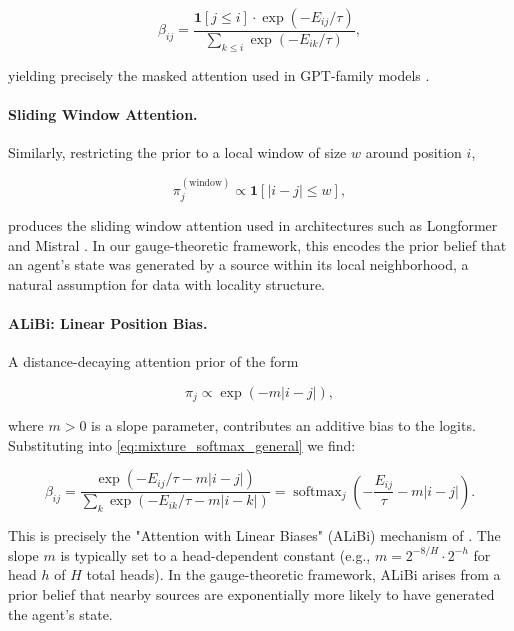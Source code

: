 \documentclass[twoside,11pt]{article}
\begin{document}
\begin{equation}
\beta_{ij} = \frac{\mathbf{1}[j \leq i] \cdot \exp(-E_{ij}/\tau)}{\sum_{k \leq i} \exp(-E_{ik}/\tau)},
\label{eq:causal_attention}
\end{equation}

yielding precisely the masked attention used in GPT-family models \citep{radford2019language}. 

\paragraph{Sliding Window Attention.}
Similarly, restricting the prior to a local window of size $w$ around position $i$,

\begin{equation}
\pi_j^{(\text{window})} \propto \mathbf{1}[|i - j| \leq w],
\label{eq:window_prior}
\end{equation}

produces the sliding window attention used in architectures such as Longformer \citep{beltagy2020longformer} and Mistral \citep{jiang2023mistral}. In our gauge-theoretic framework, this encodes the prior belief that an agent's state was generated by a source within its local neighborhood, a natural assumption for data with locality structure.

\paragraph{ALiBi: Linear Position Bias.}
A distance-decaying attention prior of the form

\begin{equation}
\pi_j \propto \exp(-m|i - j|),
\label{eq:alibi_prior}
\end{equation}

where $m > 0$ is a slope parameter, contributes an additive bias to the logits. Substituting into \eqref{eq:mixture_softmax_general} we find:

\begin{equation}
\beta_{ij} = \frac{\exp(-E_{ij}/\tau - m|i-j|)}{\sum_k \exp(-E_{ik}/\tau - m|i-k|)} = \operatorname{softmax}_j\!\left(-\frac{E_{ij}}{\tau} - m|i - j|\right).
\label{eq:alibi_attention}
\end{equation}

This is precisely the "Attention with Linear Biases" (ALiBi) mechanism of \citet{press2022train}. The slope $m$ is typically set to a head-dependent constant (e.g., $m = 2^{-8/H} \cdot 2^{-h}$ for head $h$ of $H$ total heads). In the gauge-theoretic framework, ALiBi arises from a prior belief that nearby sources are exponentially more likely to have generated the agent's state.
\end{document}
